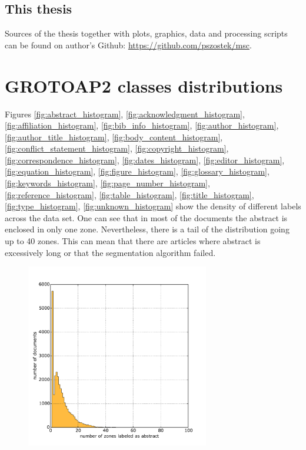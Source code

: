 \begin{appendix}
\section{This thesis}
Sources of the thesis together with plots, graphics, data and processing scripts can be found on author's Github: \url{https://github.com/pszostek/msc}.


\chapter{GROTOAP2 classes distributions}
\label{app:grotoap2}
Figures \ref{fig:abstract_histogram}, \ref{fig:acknowledgment_histogram}, \ref{fig:affiliation_histogram}, \ref{fig:bib_info_histogram}, \ref{fig:author_histogram}, \ref{fig:author_title_histogram}, \ref{fig:body_content_histogram}, \ref{fig:conflict_statement_histogram}, \ref{fig:copyright_histogram}, \ref{fig:correspondence_histogram}, \ref{fig:dates_histogram}, \ref{fig:editor_histogram}, \ref{fig:equation_histogram}, \ref{fig:figure_histogram}, \ref{fig:glossary_histogram}, \ref{fig:keywords_histogram}, \ref{fig:page_number_histogram}, \ref{fig:reference_histogram}, \ref{fig:table_histogram}, \ref{fig:title_histogram}, \ref{fig:type_histogram}, \ref{fig:unknown_histogram} show the density of different labels across the data set. One can see that in most of the documents the abstract is enclosed in only one zone. Nevertheless, there is a tail of the distribution going up to 40 zones. This can mean that there are articles where abstract is excessively long or that the segmentation algorithm failed. \\
\begin{figure}[b!]
\centering
\begin{minipage}[t!]{0.48\linewidth}
  \includegraphics[width=8cm]{plots/abstract_histogram}

\end{minipage}
\end{figure}
\end{appendix}
